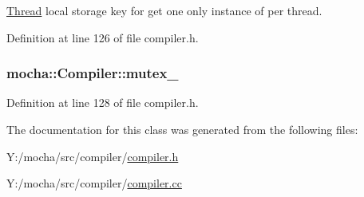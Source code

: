 \hyperlink{classmocha_1_1_thread}{Thread} local storage key for get one only instance of per thread. 



Definition at line 126 of file compiler.h.

\hypertarget{classmocha_1_1_compiler_a58bd1414408ce47c311e7f265082a8f1}{
\subsubsection[{mutex\_\-}]{ {\bf mocha::Compiler::mutex\_\-}}}
\label{classmocha_1_1_compiler_a58bd1414408ce47c311e7f265082a8f1}


Definition at line 128 of file compiler.h.



The documentation for this class was generated from the following files:\begin{DoxyCompactItemize}
\item 
Y:/mocha/src/compiler/\hyperlink{compiler_8h}{compiler.h}\item 
Y:/mocha/src/compiler/\hyperlink{compiler_8cc}{compiler.cc}\end{DoxyCompactItemize}

